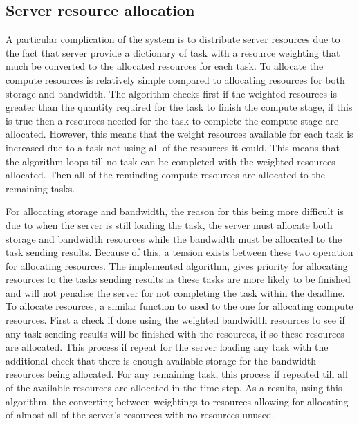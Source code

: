 \subsection{Server resource allocation}\label{subsec:server-resource-allocation}
A particular complication of the system is to distribute server resources due to the fact that server provide a
dictionary of task with a resource weighting that much be converted to the allocated resources for each task.
To allocate the compute resources is relatively simple compared to allocating resources for both storage and bandwidth.
The algorithm checks first if the weighted resources is greater than the quantity required for the task to finish the
compute stage, if this is true then a resources needed for the task to complete the compute stage are allocated. However,
this means that the weight resources available for each task is increased due to a task not using all of the resources
it could. This means that the algorithm loops till no task can be completed with the weighted resources allocated.
Then all of the reminding compute resources are allocated to the remaining tasks.

For allocating storage and bandwidth, the reason for this being more difficult is due to when the server is still
loading the task, the server must allocate both storage and bandwidth resources while the bandwidth must be allocated
to the task sending results. Because of this, a tension exists between these two operation for allocating resources.
The implemented algorithm, gives priority for allocating resources to the tasks sending results as these tasks are more
likely to be finished and will not penalise the server for not completing the task within the deadline. To allocate
resources, a similar function to used to the one for allocating compute resources. First a check if done using the
weighted bandwidth resources to see if any task sending results will be finished with the resources, if so these
resources are allocated. This process if repeat for the server loading any task with the additional check that there
is enough available storage for the bandwidth resources being allocated. For any remaining task, this process if
repeated till all of the available resources are allocated in the time step. As a results, using this algorithm, the
converting between weightings to resources allowing for allocating of almost all of the server's resources with no
resources unused.

